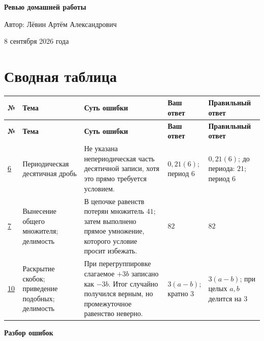 \documentclass[12pt,a4paper]{article}
\begin{document}
\begin{titlepage}
\thispagestyle{empty}
\begin{center}
\vspace*{0.24\textheight}
{\LARGE\bfseries Ревью домашней работы\par}
\vspace{2.2cm}
{\large Автор: Лёвин Артём Александрович\par}
\vspace{0.8cm}
{\large 8 сентября 2026 года\par}
\vfill
{}
\end{center}
\end{titlepage}

\newpage
\section*{Сводная таблица}
\small
\begin{longtable}{p{8mm}p{30mm}p{48mm}p{31mm}p{37mm}}
\toprule
\textbf{№} & \textbf{Тема} & \textbf{Суть ошибки} & \textbf{Ваш ответ} & \textbf{Правильный ответ} \\
\midrule
\endfirsthead
\toprule
\textbf{№} & \textbf{Тема} & \textbf{Суть ошибки} & \textbf{Ваш ответ} & \textbf{Правильный ответ} \\
\midrule
\endhead
\hyperref[task:6]{6} & Периодическая десятичная дробь & Не указана непериодическая часть десятичной записи, хотя это прямо требуется условием. & $0{,}21(6)$; период $6$ & $0{,}21(6)$; до периода: $21$; период $6$ \\
\addlinespace
\hyperref[task:7]{7} & Вынесение общего множителя; делимость & В цепочке равенств потерян множитель $41$; затем выполнено прямое умножение, которого условие просит избежать. & $82$ & $82$ \\
\addlinespace
\hyperref[task:10]{10} & Раскрытие скобок; приведение подобных; делимость & При перегруппировке слагаемое $+3b$ записано как $-3b$. Итог случайно получился верным, но промежуточное равенство неверно. & $3(a-b)$; кратно $3$ & $3(a-b)$; при целых $a,b$ делится на $3$ \\
\bottomrule
\end{longtable}
\normalsize

\newpage
\thispagestyle{empty}
\vspace*{\fill}
\begin{center}
{\LARGE\bfseries Разбор ошибок}
\end{center}
\vspace*{\fill}
\newpage
\end{document}
